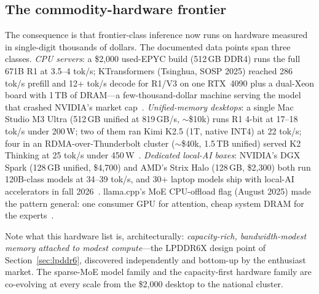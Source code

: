 \subsection{The commodity-hardware frontier}

The consequence is that frontier-class inference now runs on hardware measured in single-digit thousands of dollars. The documented data points span three classes. \emph{CPU servers}: a \$2,000 used-EPYC build (512\,GB DDR4) runs the full 671B R1 at 3.5--4 tok/s; KTransformers (Tsinghua, SOSP 2025) reached 286 tok/s prefill and 12+ tok/s decode for R1/V3 on one RTX~4090 plus a dual-Xeon board with 1\,TB of DRAM---a few-thousand-dollar machine serving the model that crashed NVIDIA's market cap~\cite{ktransformers,epyc-rig}. \emph{Unified-memory desktops}: a single Mac Studio M3 Ultra (512\,GB unified at 819\,GB/s, $\sim$\$10k) runs R1 4-bit at 17--18 tok/s under 200\,W; two of them ran Kimi K2.5 (1T, native INT4) at 22 tok/s; four in an RDMA-over-Thunderbolt cluster ($\sim$\$40k, 1.5\,TB unified) served K2 Thinking at 25 tok/s under 450\,W~\cite{mac-frontier}. \emph{Dedicated local-AI boxes}: NVIDIA's DGX Spark (128\,GB unified, \$4,700) and AMD's Strix Halo (128\,GB, \$2,300) both run 120B-class models at 34--39 tok/s, and 30+ laptop models ship with local-AI accelerators in fall 2026~\cite{spark-halo}. llama.cpp's MoE CPU-offload flag (August 2025) made the pattern general: one consumer GPU for attention, cheap system DRAM for the experts~\cite{llamacpp-moe}.

Note what this hardware list is, architecturally: \emph{capacity-rich, bandwidth-modest memory attached to modest compute}---the LPDDR6X design point of Section~\ref{sec:lpddr6}, discovered independently and bottom-up by the enthusiast market. The sparse-MoE model family and the capacity-first hardware family are co-evolving at every scale from the \$2,000 desktop to the national cluster.

